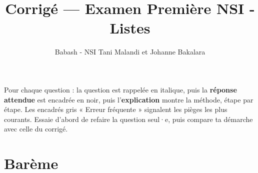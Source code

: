 \documentclass[addpoints, 11pt]{exam}
\title{Corrigé --- Examen Première NSI - Listes}
\author{Babash - NSI Tani Malandi et Johanne Bakalara}
\date{}
\DeclareRobustCommand{\_}{\textunderscore\allowbreak}
\begin{document}
\pagestyle{headandfoot}
\firstpageheader{}{}{}

\maketitle
\thispagestyle{headandfoot}

\begin{astuce}
Pour chaque question : la question est rappelée en italique, puis la \textbf{réponse attendue} est encadrée en noir, puis l'\textbf{explication} montre la méthode, étape par étape.
Les encadrés gris « Erreur fréquente » signalent les pièges les plus courants. Essaie d'abord de refaire la question seul·e, puis compare ta démarche avec celle du corrigé.
\end{astuce}

\section*{Barème}
\begin{center}
  \gradetable[h]
\end{center}
\end{document}
